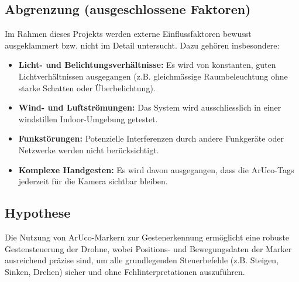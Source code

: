 \subsection{Abgrenzung (ausgeschlossene Faktoren)}
Im Rahmen dieses Projekts werden externe Einflussfaktoren bewusst ausgeklammert bzw. nicht im Detail untersucht.
Dazu gehören insbesondere:
\begin{itemize}
  \item \textbf{Licht- und Belichtungsverhältnisse:} Es wird von konstanten, guten Lichtverhältnissen ausgegangen (z.B. gleichmässige Raumbeleuchtung ohne starke Schatten oder Überbelichtung).
  \item \textbf{Wind- und Luftströmungen:} Das System wird ausschliesslich in einer windstillen Indoor-Umgebung getestet.
  \item \textbf{Funkstörungen:} Potenzielle Interferenzen durch andere Funkgeräte oder Netzwerke werden nicht berücksichtigt.
  \item \textbf{Komplexe Handgesten:} Es wird davon ausgegangen, dass die ArUco-Tags jederzeit für die Kamera sichtbar bleiben.
\end{itemize}

\subsection{Hypothese}
Die Nutzung von ArUco-Markern zur Gestenerkennung ermöglicht eine robuste Gestensteuerung der Drohne, wobei Positions- und Bewegungsdaten der Marker ausreichend präzise sind, um alle grundlegenden Steuerbefehle (z.B. Steigen, Sinken, Drehen) sicher und ohne Fehlinterpretationen auszuführen.

\endgroup